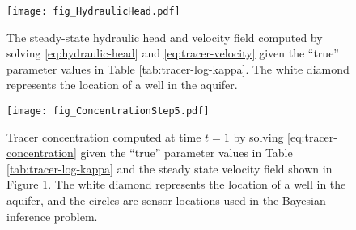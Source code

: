 \begin{figure}[h!]
\centering
    \texttt{[image: fig\_HydraulicHead.pdf]}
    \caption{The steady-state hydraulic head and velocity field computed by solving \eqref{eq:hydraulic-head} and \eqref{eq:tracer-velocity} given the ``true'' parameter values in Table \ref{tab:tracer-log-kappa}. The white diamond represents the location of a well in the aquifer.}
    \label{fig:tracer-transport-hydraulic-head}
\end{figure}

\begin{figure}[h!]
\centering
    \texttt{[image: fig\_ConcentrationStep5.pdf]}
    \caption{Tracer concentration computed at time $t=1$ by solving \eqref{eq:tracer-concentration} given the ``true'' parameter values in Table \ref{tab:tracer-log-kappa} and the steady state velocity field shown in Figure \ref{fig:tracer-transport-hydraulic-head}. The white diamond represents the location of a well in the aquifer, and the circles are sensor locations used in the Bayesian inference problem.}
    \label{fig:tracer-transport-concentration}
\end{figure}

